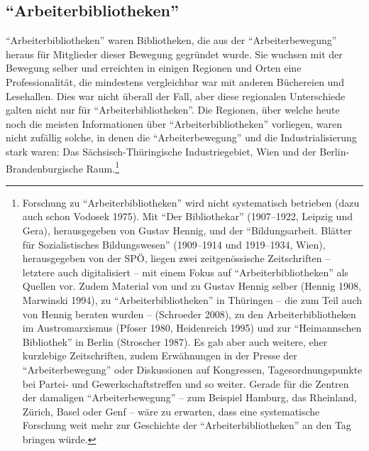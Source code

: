 \documentclass[a4paper,
fontsize=11pt,
oneside,
numbers=noperiodatend,
parskip=half-,
bibliography=totoc,
final
]{scrartcl}
\begin{document}
\hypertarget{arbeiterbibliotheken}{%
\subsection*{\texorpdfstring{\enquote{Arbeiterbibliotheken}}{``Arbeiterbibliotheken''}}\label{arbeiterbibliotheken}}

\enquote{Arbeiterbibliotheken} waren Bibliotheken, die aus der
\enquote{Arbeiterbewegung} heraus für Mitglieder dieser Bewegung
gegründet wurde. Sie wuchsen mit der Bewegung selber und erreichten in
einigen Regionen und Orten eine Professionalität, die mindestens
vergleichbar war mit anderen Büchereien und Lesehallen. Dies war nicht
überall der Fall, aber diese regionalen Unterschiede galten nicht nur
für \enquote{Arbeiterbibliotheken}. Die Regionen, über welche heute noch
die meisten Informationen über \enquote{Arbeiterbibliotheken} vorliegen,
waren nicht zufällig solche, in denen die \enquote{Arbeiterbewegung} und
die Industrialisierung stark waren: Das Sächsisch-Thü\-rin\-gische
Industriegebiet, Wien und der Berlin-Brandenburgische Raum.\footnote{Forschung
  zu \enquote{Arbeiterbibliotheken} wird nicht systematisch betrieben
  (dazu auch schon Vodosek 1975). Mit \enquote{Der Bibliothekar}
  (1907--1922, Leipzig und Gera), herausgegeben von Gustav Hennig, und
  der \enquote{Bildungsarbeit. Blätter für Sozialistisches
  Bildungswesen} (1909--1914 und 1919--1934, Wien), herausgegeben von
  der SPÖ, liegen zwei zeitgenössische Zeitschriften -- letztere auch
  digitalisiert -- mit einem Fokus auf \enquote{Arbeiterbibliotheken}
  als Quellen vor. Zudem Material von und zu Gustav Hennig selber
  (Hennig 1908, Marwinski 1994), zu \enquote{Arbeiterbibliotheken} in
  Thüringen -- die zum Teil auch von Hennig beraten wurden -- (Schroeder
  2008), zu den Arbeiterbibliotheken im Austromarxismus (Pfoser 1980,
  Heidenreich 1995) und zur \enquote{Heimannschen Bibliothek} in Berlin
  (Stroscher 1987). Es gab aber auch weitere, eher kurzlebige
  Zeitschriften, zudem Erwähnungen in der Presse der
  \enquote{Arbeiterbewegung} oder Diskussionen auf Kongressen,
  Tagesordnungspunkte bei Partei- und Gewerkschaftstreffen und so
  weiter. Gerade für die Zentren der damaligen
  \enquote{Arbeiterbewegung} -- zum Beispiel Hamburg, das Rheinland,
  Zürich, Basel oder Genf -- wäre zu erwarten, dass eine systematische
  Forschung weit mehr zur Geschichte der \enquote{Arbeiterbibliotheken}
  an den Tag bringen würde.}
\end{document}
